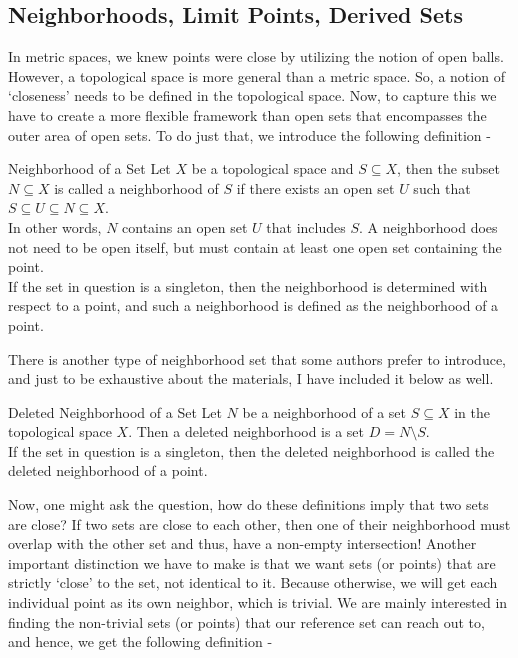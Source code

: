 \subsection{Neighborhoods, Limit Points, Derived Sets}
In metric spaces, we knew points were close by utilizing the notion of open balls. However, a topological space is more general than a metric space. So, a notion of `closeness' needs to be defined in the topological space. Now, to capture this we have to create a more flexible framework than open sets that encompasses the outer area of open sets. To do just that, we introduce the following definition - 
\begin{Definition}{Neighborhood of a Set}\label{neighborhood_topology}
    Let $X$ be a topological space and $S\subseteq X$, then the subset $N\subseteq X$ is called a neighborhood of $S$ if there exists an open set $U$ such that $S\subseteq U\subseteq N\subseteq X$.\\
    In other words, $N$ contains an open set $U$ that includes $S$. A neighborhood does not need to be open itself, but must contain at least one open set containing the point.\\
    If the set in question is a singleton, then the neighborhood is determined with respect to a point, and such a neighborhood is defined as the neighborhood of a point.
\end{Definition}
\noindent There is another type of neighborhood set that some authors prefer to introduce, and just to be exhaustive about the materials, I have included it below as well.
\begin{Definition}{Deleted Neighborhood of a Set}\label{deleted_neighborhood_topology}
    Let $N$ be a neighborhood of a set $S\subseteq X$ in the topological space $X$. Then a deleted neighborhood is a set $D=N\setminus S$.\\
    If the set in question is a singleton, then the deleted neighborhood is called the deleted neighborhood of a point.
\end{Definition}
\noindent Now, one might ask the question, how do these definitions imply that two sets are close? If two sets are close to each other, then one of their neighborhood must overlap with the other set and thus, have a non-empty intersection! Another important distinction we have to make is that we want sets (or points) that are strictly `close' to the set, not identical to it. Because otherwise, we will get each individual point as its own neighbor, which is trivial. We are mainly interested in finding the non-trivial sets (or points) that our reference set can reach out to, and hence, we get the following definition -
